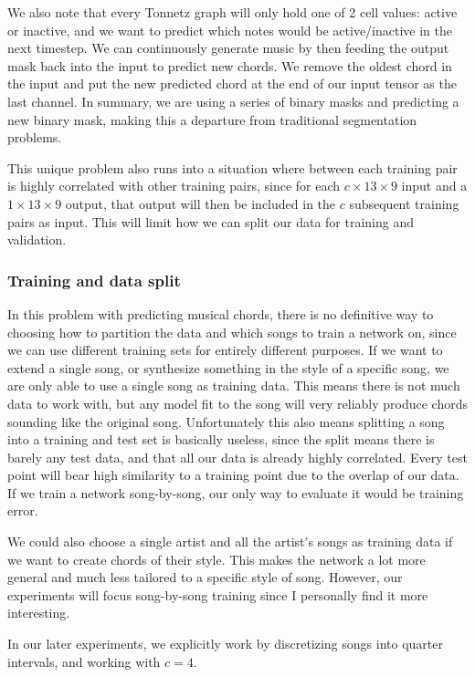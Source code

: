 \documentclass[
	a4paper, %
	10pt, %
	unnumberedsections, %
	twoside, %
]{LTJournalArticle}
\begin{document}
We also note that every Tonnetz graph will only hold one of 2 cell values: active or inactive, and we want to predict which notes would be active/inactive in the next timestep. We can continuously generate music by then feeding the output mask back into the input to predict new chords. We remove the oldest chord in the input and put the new predicted chord at the end of our input tensor as the last channel. In summary, we are using a series of binary masks and predicting a new binary mask, making this a departure from traditional segmentation problems.

This unique problem also runs into a situation where between each training pair is highly correlated with other training pairs, since for each $c\times13\times9$ input and a $1\times13\times9$ output, that output will then be included in the $c$ subsequent training pairs as input. This will limit how we can split our data for training and validation.

\subsubsection{Training and data split}

In this problem with predicting musical chords, there is no definitive way to choosing how to partition the data and which songs to train a network on, since we can use different training sets for entirely different purposes. If we want to extend a single song, or synthesize something in the style of a specific song, we are only able to use a single song as training data. This means there is not much data to work with, but any model fit to the song will very reliably produce chords sounding like the original song. Unfortunately this also means splitting a song into a training and test set is basically useless, since the split means there is barely any test data, and that all our data is already highly correlated. Every test point will bear high similarity to a training point due to the overlap of our data. If we train a network song-by-song, our only way to evaluate it would be training error.

We could also choose a single artist and all the artist's songs as training data if we want to create chords of their style. This makes the network a lot more general and much less tailored to a specific style of song. However, our experiments will focus song-by-song training since I personally find it more interesting.

In our later experiments, we explicitly work by discretizing songs into quarter intervals, and working with $c=4$.
\end{document}
